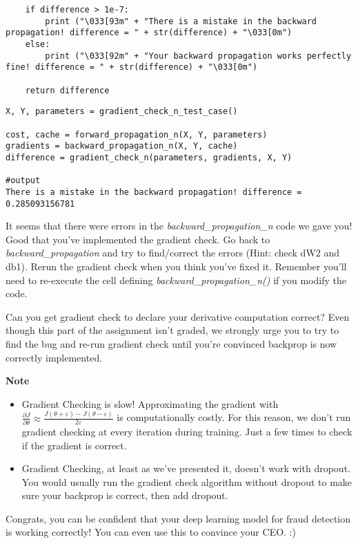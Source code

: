 \begin{verbatim}
    if difference > 1e-7:
        print ("\033[93m" + "There is a mistake in the backward propagation! difference = " + str(difference) + "\033[0m")
    else:
        print ("\033[92m" + "Your backward propagation works perfectly fine! difference = " + str(difference) + "\033[0m")
    
    return difference
\end{verbatim}

\begin{verbatim}
X, Y, parameters = gradient_check_n_test_case()

cost, cache = forward_propagation_n(X, Y, parameters)
gradients = backward_propagation_n(X, Y, cache)
difference = gradient_check_n(parameters, gradients, X, Y)

#output
There is a mistake in the backward propagation! difference = 0.285093156781
\end{verbatim}


It seems that there were errors in the \emph{backward\_propagation\_n} code we gave you! Good that you've implemented the gradient check. Go back to \emph{backward\_propagation} and try to find/correct the errors {\color{red} (Hint: check dW2 and db1)}. Rerun the gradient check when you think you've fixed it. Remember you'll need to re-execute the cell defining \emph{backward\_propagation\_n()} if you modify the code. 

Can you get gradient check to declare your derivative computation correct? Even though this part of the assignment isn't graded, we strongly urge you to try to find the bug and re-run gradient check until you're convinced backprop is now correctly implemented. 

{\textbf{Note}}
\begin{itemize}
\item Gradient Checking is slow! Approximating the gradient with $\frac{\partial J}{\partial \theta} \approx  \frac{J(\theta + \varepsilon) - J(\theta - \varepsilon)}{2 \varepsilon}$ is computationally costly. For this reason, we don't run gradient checking at every iteration during training. Just a few times to check if the gradient is correct. 
\item Gradient Checking, at least as we've presented it, doesn't work with dropout. You would usually run the gradient check algorithm without dropout to make sure your backprop is correct, then add dropout. 
\end{itemize}

Congrats, you can be confident that your deep learning model for fraud detection is working correctly! You can even use this to convince your CEO. :) 


